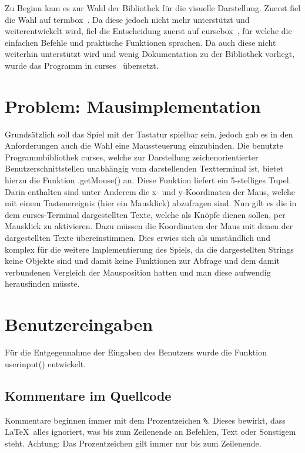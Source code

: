\documentclass{llncs}
\begin{document}
Zu Beginn kam es zur Wahl der Bibliothek für die visuelle Darstellung. Zuerst fiel die Wahl auf termbox~\cite{Termbox}. Da diese jedoch nicht mehr unterstützt und weiterentwickelt wird, fiel die Entscheidung zuerst auf cursebox~\cite{Cursebox}, für welche
die einfachen Befehle und praktische Funktionen sprachen. Da auch diese nicht weiterhin unterstützt wird und wenig Dokumentation zu der Bibliothek vorliegt, wurde das Programm in curses~\cite{Curses} übersetzt.

\section{Problem: Mausimplementation}

Grundsätzlich soll das Spiel mit der Tastatur spielbar sein, jedoch gab es in den Anforderungen auch die Wahl eine Maussteuerung einzubinden.
Die benutzte Programmbibliothek \glqq curses\grqq{}, welche zur Darstellung zeichenorientierter Benutzerschnittstellen unabhängig vom darstellenden Textterminal ist,
bietet hierzu die Funktion .getMouse() an. Diese Funktion liefert ein 5-stelliges Tupel. Darin enthalten sind unter Anderem die x- und y-Koordinaten der Maus,
welche mit einem Tastenereignis (hier ein Mausklick) abzufragen sind. Nun gilt es die in dem curses-Terminal dargestellten Texte, welche als Knöpfe dienen sollen,
per Mausklick zu aktivieren. Dazu müssen die Koordinaten der Maus mit denen der dargestellten Texte übereinstimmen. Dies erwies sich als umständlich und komplex für die
weitere Implementierung des Spiels, da die dargestellten Strings keine Objekte sind und damit keine Funktionen zur Abfrage und dem damit verbundenen Vergleich der Mausposition hatten und man diese aufwendig herausfinden müsste.

\section{Benutzereingaben}

Für die Entgegennahme der Eingaben des Benutzers wurde die Funktion \glqq userinput()\grqq{} entwickelt. 

\subsection{Kommentare im Quellcode}

Kommentare beginnen immer mit dem Prozentzeichen \verb!%!. Dieses bewirkt, dass \LaTeX\ alles ignoriert, was bis zum Zeilenende an Befehlen, Text oder Sonstigem steht. Achtung: Das Prozentzeichen gilt immer nur bis zum Zeilenende.
\end{document}

